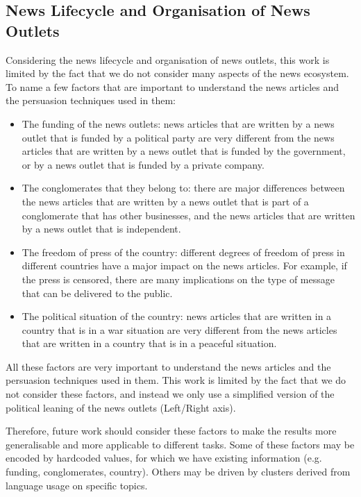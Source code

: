 
\subsection{News Lifecycle and Organisation of News Outlets}
Considering the news lifecycle and organisation of news outlets, this work is limited by the fact that we do not consider many aspects of the news ecosystem.
To name a few factors that are important to understand the news articles and the persuasion techniques used in them:
\begin{itemize}
    \item The funding of the news outlets: news articles that are written by a news outlet that is funded by a political party are very different from the news articles that are written by a news outlet that is funded by the government, or by a news outlet that is funded by a private company.
    \item The conglomerates that they belong to: there are major differences between the news articles that are written by a news outlet that is part of a conglomerate that has other businesses, and the news articles that are written by a news outlet that is independent.
    \item The freedom of press of the country: different degrees of freedom of press in different countries have a major impact on the news articles. For example, if the press is censored, there are many implications on the type of message that can be delivered to the public.
    \item The political situation of the country: news articles that are written in a country that is in a war situation are very different from the news articles that are written in a country that is in a peaceful situation.
\end{itemize}

All these factors are very important to understand the news articles and the persuasion techniques used in them. This work is limited by the fact that we do not consider these factors, and instead we only use a simplified version of the political leaning of the news outlets (Left/Right axis).

Therefore, future work should consider these factors to make the results more generalisable and more applicable to different tasks.
Some of these factors may be encoded by hardcoded values, for which we have existing information (e.g. funding, conglomerates, country).
Others may be driven by clusters derived from language usage on specific topics.

